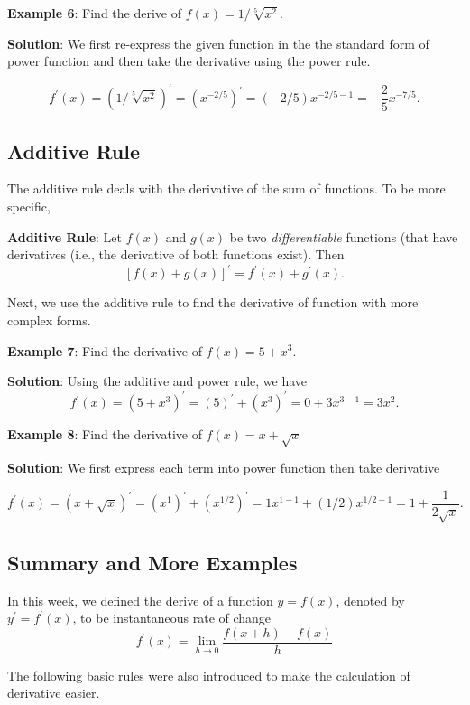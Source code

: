 \documentclass[
]{book}
\begin{document}
\textbf{Example 6}: Find the derive of \(f(x) = 1/\sqrt[5]{x^2}\).

\textbf{Solution}: We first re-express the given function in the the standard form of power function and then take the derivative using the power rule.

\[
f^\prime(x) = (1/\sqrt[5]{x^2})^\prime = \left( x^{-2/5}\right)^\prime = (-2/5)x^{-2/5 - 1} = -\frac{2}{5}x^{-7/5}.
\]

\hypertarget{additive-rule}{%
\subsection{Additive Rule}\label{additive-rule}}

The additive rule deals with the derivative of the sum of functions. To be more specific,

\textbf{Additive Rule}: Let \(f(x)\) and \(g(x)\) be two \emph{differentiable} functions (that have derivatives (i.e., the derivative of both functions exist). Then
\[
[f(x) + g(x)]^\prime = f^\prime(x) + g^\prime(x).
\]

Next, we use the additive rule to find the derivative of function with more complex forms.

\textbf{Example 7}: Find the derivative of \(f(x) = 5 + x^3\).

\textbf{Solution}: Using the additive and power rule, we have
\[
f^\prime(x) = (5 + x^3)^\prime = (5)^\prime + (x^3)^\prime = 0 + 3x^{3-1} = 3x^2.
\]

\textbf{Example 8}: Find the derivative of \(f(x) = x + \sqrt{x}\)

\textbf{Solution}: We first express each term into power function then take derivative

\[
f^\prime(x) = (x + \sqrt{x})^\prime = (x^1)^\prime + (x^{1/2})^\prime = 1x^{1-1} + (1/2)x^{1/2-1} = 1 + \frac{1}{2\sqrt{x}}.
\]

\hypertarget{summary-and-more-examples}{%
\subsection{Summary and More Examples}\label{summary-and-more-examples}}

In this week, we defined the derive of a function \(y = f(x)\), denoted by \(y^\prime = f^\prime(x)\), to be instantaneous rate of change
\[
f^\prime(x) = \lim_{h \to 0}\frac{f(x+h)-f(x)}{h}
\]

The following basic rules were also introduced to make the calculation of derivative easier.
\end{document}
